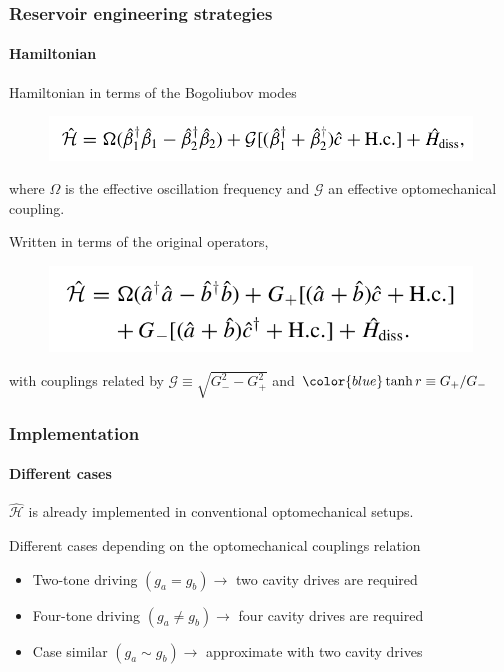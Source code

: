 \documentclass[aspectratio=43]{beamer}
\begin{document}
\begin{frame}
	
	\frametitle{Reservoir engineering strategies}
	\framesubtitle{Hamiltonian}
	
	Hamiltonian in terms of the Bogoliubov modes
	\begin{figure}
		\includegraphics[width = 8.5 cm]{plots/hamiltonian_3.png}
	\end{figure}	
	
	where $\Omega$ is the effective oscillation frequency and $\mathcal{G}$ an effective optomechanical coupling.
	
	\vspace{0.5 cm}
	
	Written in terms of the original operators,
	\begin{figure}
		\includegraphics[width = 7.5 cm]{plots/hamiltonian_4.png}
	\end{figure}

	with couplings related by $\mathcal{G} \equiv \sqrt{G_{-}^{2} - G_{+}^{2}}$ and ${\color{blue}\tanh r \equiv G_{+}/G_{-}}$

\end{frame}

\begin{frame}

	\frametitle{Implementation}
	\framesubtitle{Different cases}
	
		$\hat{\mathcal{H}}$ is already implemented in conventional optomechanical setups.
		
		\vspace{0.5 cm}
		
		Different cases depending on the optomechanical couplings relation

	\begin{itemize}
		\item Two-tone driving $(g_{a} = g_{b}) \longrightarrow$ two cavity drives are required 
		\item Four-tone driving $(g_{a} \neq g_{b}) \longrightarrow$ four cavity drives are required 
		\item Case similar $(g_{a} \sim g_{b}) \longrightarrow$ approximate with two cavity drives
	\end{itemize}	

\end{frame}
\end{document}
